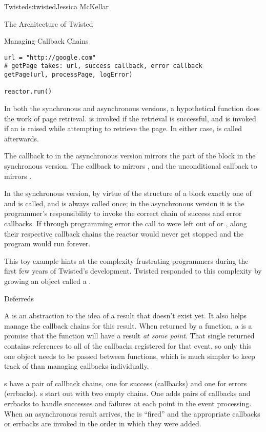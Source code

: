 \begin{aosachapter}{Twisted}{s:twisted}{Jessica McKellar}
\begin{aosasect1}{The Architecture of Twisted}
\begin{aosasect2}{Managing Callback Chains}
\begin{verbatim}
url = "http://google.com"
# getPage takes: url, success callback, error callback
getPage(url, processPage, logError)

reactor.run()
\end{verbatim}

In both the synchronous and asynchronous versions, a hypothetical
 function does the work of page
retrieval.  is invoked if the retrieval is successful,
and  is invoked if an  is raised
while attempting to retrieve the page. In either case,
 is called afterwards.

The callback to  in the asynchronous version mirrors the
 part of the  block in the synchronous
version. The callback to  mirrors , and
the unconditional callback to  mirrors
.

In the synchronous version, by virtue of the structure of a
 block exactly one of  and
 is called, and  is always
called once; in the asynchronous version it is the programmer's responsibility
to invoke the correct chain of success and error callbacks. If through
programming error the call to  were left out of
 or , along their respective
callback chains the reactor would never get stopped and the program would run
forever.

This toy example hints at the complexity frustrating programmers during the
first few years of Twisted's development. Twisted responded to this complexity
by growing an object called a .

\begin{aosasect3}{Deferreds}

A  is an abstraction to the idea of a result that
doesn't exist yet. It also helps manage the callback chains for this
result. When returned by a function, a  is a promise
that the function will have a result \emph{at some point}. That single
returned  contains references to all of the callbacks
registered for that event, so only this one object needs to be passed
between functions, which is much simpler to keep track of than
managing callbacks individually.

s have a pair of callback chains, one for success
(callbacks) and one for errors (errbacks). s start out with
two empty chains. One adds pairs of callbacks and errbacks to handle successes
and failures at each point in the event processing. When an asynchronous result
arrives, the  is ``fired'' and the appropriate callbacks or
errbacks are invoked in the order in which they were added.


\end{aosasect3}
\end{aosasect2}
\end{aosasect1}
\end{aosachapter}

